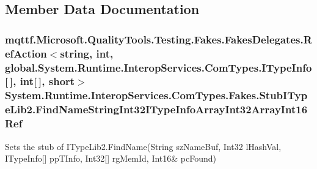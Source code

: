 \subsection{Member Data Documentation}
\hypertarget{class_system_1_1_runtime_1_1_interop_services_1_1_com_types_1_1_fakes_1_1_stub_i_type_lib2_ae27d40f00a6af2b5b06d48bfc306adaf}{
\subsubsection[{Find\-Name\-String\-Int32\-I\-Type\-Info\-Array\-Int32\-Array\-Int16\-Ref}]{\setlength{\rightskip}{0pt plus 5cm}mqttf.\-Microsoft.\-Quality\-Tools.\-Testing.\-Fakes.\-Fakes\-Delegates.\-Ref\-Action$<$string, int, global.\-System.\-Runtime.\-Interop\-Services.\-Com\-Types.\-I\-Type\-Info\mbox{[}$\,$\mbox{]}, int\mbox{[}$\,$\mbox{]}, short$>$ System.\-Runtime.\-Interop\-Services.\-Com\-Types.\-Fakes.\-Stub\-I\-Type\-Lib2.\-Find\-Name\-String\-Int32\-I\-Type\-Info\-Array\-Int32\-Array\-Int16\-Ref}}\label{class_system_1_1_runtime_1_1_interop_services_1_1_com_types_1_1_fakes_1_1_stub_i_type_lib2_ae27d40f00a6af2b5b06d48bfc306adaf}


Sets the stub of I\-Type\-Lib2.\-Find\-Name(String sz\-Name\-Buf, Int32 l\-Hash\-Val, I\-Type\-Info\mbox{[}\mbox{]} pp\-T\-Info, Int32\mbox{[}\mbox{]} rg\-Mem\-Id, Int16\& pc\-Found)

